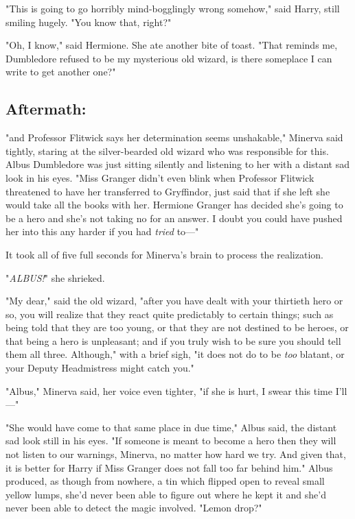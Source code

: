 "This is going to go horribly mind-bogglingly wrong somehow," said Harry, still
smiling hugely. "You know that, right?"

"Oh, I know," said Hermione. She ate another bite of toast. "That reminds me,
Dumbledore refused to be my mysterious old wizard, is there someplace I can
write to get another one?"
\sbreak
\vspace{-2\baselineskip}
\subsection{Aftermath:}

"{\el}and Professor Flitwick says her determination seems unshakable,"
Minerva said tightly, staring at the silver-bearded old wizard who was
responsible for this. Albus Dumbledore was just sitting silently and listening
to her with a distant sad look in his eyes. "Miss Granger didn't even blink
when Professor Flitwick threatened to have her transferred to Gryffindor, just
said that if she left she would take all the books with her. Hermione Granger
has decided she's going to be a hero and she's not taking no for an answer. I
doubt you could have pushed her into this any harder if you had \emph{tried}
to---"

It took all of five full seconds for Minerva's brain to process the realization.

"\emph{ALBUS!}" she shrieked.

"My dear," said the old wizard, "after you have dealt with your thirtieth hero
or so, you will realize that they react quite predictably to certain things;
such as being told that they are too young, or that they are not destined to be
heroes, or that being a hero is unpleasant; and if you truly wish to be sure
you should tell them all three. Although," with a brief sigh, "it does not do
to be \emph{too} blatant, or your Deputy Headmistress might catch you."

"Albus," Minerva said, her voice even tighter, "if she is hurt, I swear this
time I'll---"

"She would have come to that same place in due time," Albus said, the distant
sad look still in his eyes. "If someone is meant to become a hero then they
will not listen to our warnings, Minerva, no matter how hard we try. And given
that, it is better for Harry if Miss Granger does not fall too far behind him."
Albus produced, as though from nowhere, a tin which flipped open to reveal
small yellow lumps, she'd never been able to figure out where he kept it and
she'd never been able to detect the magic involved. "Lemon drop?"

